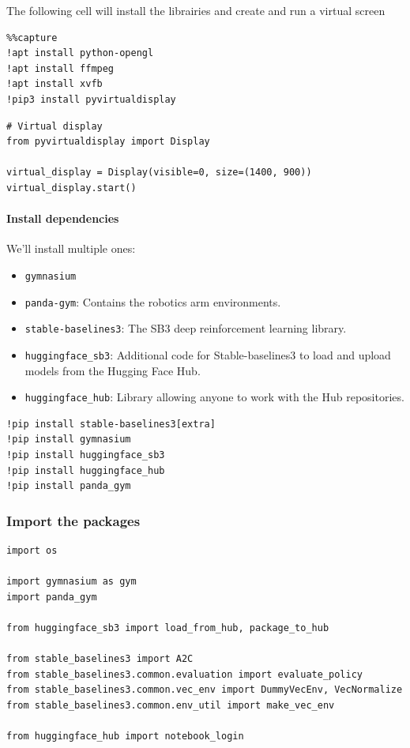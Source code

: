 \documentclass[11pt,a4paper]{article}
\begin{document}
The following cell will install the librairies and create and run a virtual screen

\begin{lstlisting}
%%capture
!apt install python-opengl
!apt install ffmpeg
!apt install xvfb
!pip3 install pyvirtualdisplay
\end{lstlisting}

\begin{lstlisting}
# Virtual display
from pyvirtualdisplay import Display

virtual_display = Display(visible=0, size=(1400, 900))
virtual_display.start()
\end{lstlisting}

\paragraph{Install dependencies}\label{install-dependencies}

We'll install multiple ones:

\begin{itemize}
\tightlist
\item
  \texttt{gymnasium}
\item
  \texttt{panda-gym}: Contains the robotics arm environments.
\item
  \texttt{stable-baselines3}: The SB3 deep reinforcement learning library.
\item
  \texttt{huggingface\_sb3}: Additional code for Stable-baselines3 to load and upload models from the Hugging Face Hub.
\item
  \texttt{huggingface\_hub}: Library allowing anyone to work with the Hub repositories.
\end{itemize}

\begin{lstlisting}
!pip install stable-baselines3[extra]
!pip install gymnasium
!pip install huggingface_sb3
!pip install huggingface_hub
!pip install panda_gym
\end{lstlisting}

\subsubsection{Import the packages}\label{import-the-packages}

\begin{lstlisting}
import os

import gymnasium as gym
import panda_gym

from huggingface_sb3 import load_from_hub, package_to_hub

from stable_baselines3 import A2C
from stable_baselines3.common.evaluation import evaluate_policy
from stable_baselines3.common.vec_env import DummyVecEnv, VecNormalize
from stable_baselines3.common.env_util import make_vec_env

from huggingface_hub import notebook_login
\end{lstlisting}
\end{document}
